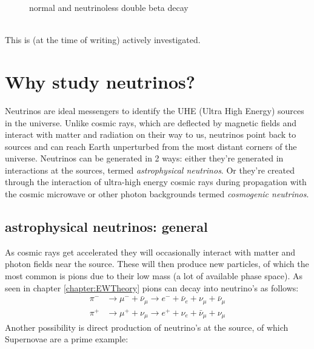\documentclass[11pt,a4paper,faculty=we,language=en,doctype=report]{cls/ugent-doc}
\begin{document}
\begin{figure}[h!]
\begin{minipage}{\textwidth}
\begin{minipage}{0.49\textwidth}
		\end{minipage}
	\end{minipage}
	\caption{normal and neutrinoless double beta decay}
\end{figure}\\
This is (at the time of writing) actively investigated.
\section{Why study neutrinos?}
Neutrinos are ideal messengers to identify the UHE (Ultra High Energy) sources
in the universe. Unlike cosmic rays, which are deflected by magnetic fields and
interact with matter and radiation on their way to us, neutrinos point back to
sources and can reach Earth unperturbed from the most distant corners of the
universe.  Neutrinos can be generated in 2 ways: either they're generated in
interactions at the sources, termed \textit{astrophysical neutrinos}. Or
they're created through the interaction of ultra-high energy cosmic rays during
propagation with the cosmic microwave or other photon backgrounds termed
\textit{cosmogenic neutrinos}. 
\subsection{astrophysical neutrinos: general}
As cosmic rays get accelerated they will occasionally interact with matter
and photon fields near the source. These will then produce new particles,
of which the most common is pions due to their low mass (a lot of available 
phase space). As seen in chapter \ref{chapter:EWTheory} pions can decay
into neutrino's as follows:
\begin{eqnarray}
	\pi^- &\rightarrow \mu^- + \bar{\nu}_\mu \rightarrow e^- + \bar{\nu}_e + \nu_\mu + \bar{\nu}_\mu\\
	\pi^+ &\rightarrow \mu^+ + \nu_\mu \rightarrow e^+ + \nu_e + \bar{\nu}_\mu + \nu_\mu
\end{eqnarray}
Another possibility is direct production of neutrino's at the source, of which Supernovae are
a prime example:
\end{document}
